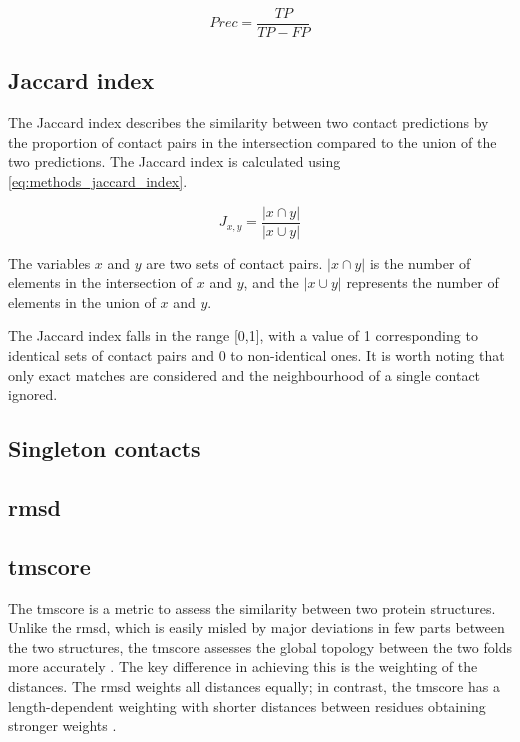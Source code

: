 \begin{equation} 
Prec = \frac{TP}{TP-FP}
\label{eq:methods_precision}
\end{equation}

\subsection{Jaccard index} \label{sec:methods_jaccard_idx}
The Jaccard index describes the similarity between two contact predictions by the proportion of contact pairs in the intersection compared to the union of the two predictions. The Jaccard index is calculated using \cref{eq:methods_jaccard_index}.

\begin{equation} 
J_{x,y}=\frac{\left |x \cap y\right |}{\left |x \cup y\right |}
\label{eq:methods_jaccard_index}
\end{equation}

The variables $x$ and $y$ are two sets of contact pairs. $\left |x \cap y\right |$ is the number of elements in the intersection of $x$ and $y$, and the $\left |x \cup y\right |$ represents the number of elements in the union of $x$ and $y$.

The Jaccard index falls in the range [0,1], with a value of 1 corresponding to identical sets of contact pairs and 0 to non-identical ones. It is worth noting that only exact matches are considered and the neighbourhood of a single contact ignored.

\subsection{Singleton contacts} \label{sec:methods_singleton_contacts}
\subsection{\acrlong{rmsd}} \label{sec:methods_rmsd}
\subsection{\acrlong{tmscore}} \label{sec:methods_tmscore}
The \gls{tmscore} is a metric to assess the similarity between two protein structures. Unlike the \gls{rmsd}, which is easily misled by major deviations in few parts between the two structures, the \gls{tmscore} assesses the global topology between the two folds more accurately \cite{Zhang2005-hx}. The key difference in achieving this is the weighting of the distances. The \gls{rmsd} weights all distances equally; in contrast, the \gls{tmscore} has a length-dependent weighting with shorter distances between residues obtaining stronger weights \cite{Zhang2005-hx}.

